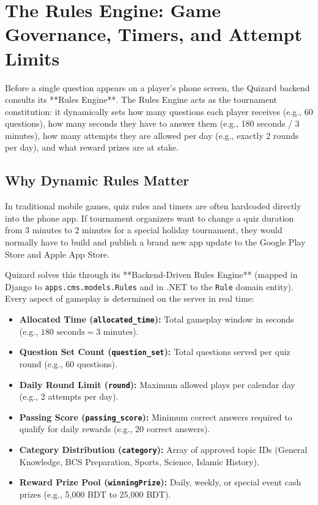 \chapter{The Rules Engine: Game Governance, Timers, and Attempt Limits}

\begin{tcolorbox}[storybox, title={The Rules Engine in Brief}]
Before a single question appears on a player's phone screen, the Quizard backend consults its **Rules Engine**. The Rules Engine acts as the tournament constitution: it dynamically sets how many questions each player receives (e.g., 60 questions), how many seconds they have to answer them (e.g., 180 seconds / 3 minutes), how many attempts they are allowed per day (e.g., exactly 2 rounds per day), and what reward prizes are at stake.
\end{tcolorbox}

\section{Why Dynamic Rules Matter}
In traditional mobile games, quiz rules and timers are often hardcoded directly into the phone app. If tournament organizers want to change a quiz duration from 3 minutes to 2 minutes for a special holiday tournament, they would normally have to build and publish a brand new app update to the Google Play Store and Apple App Store.

Quizard solves this through its **Backend-Driven Rules Engine** (mapped in Django to \texttt{apps.cms.models.Rules} and in .NET to the \texttt{Rule} domain entity). Every aspect of gameplay is determined on the server in real time:

\begin{itemize}
    \item \textbf{Allocated Time (\texttt{allocated\_time}):} Total gameplay window in seconds (e.g., $180\text{ seconds} = 3\text{ minutes}$).
    \item \textbf{Question Set Count (\texttt{question\_set}):} Total questions served per quiz round (e.g., 60 questions).
    \item \textbf{Daily Round Limit (\texttt{round}):} Maximum allowed plays per calendar day (e.g., 2 attempts per day).
    \item \textbf{Passing Score (\texttt{passing\_score}):} Minimum correct answers required to qualify for daily rewards (e.g., 20 correct answers).
    \item \textbf{Category Distribution (\texttt{category}):} Array of approved topic IDs (General Knowledge, BCS Preparation, Sports, Science, Islamic History).
    \item \textbf{Reward Prize Pool (\texttt{winningPrize}):} Daily, weekly, or special event cash prizes (e.g., 5,000 BDT to 25,000 BDT).
\end{itemize}

